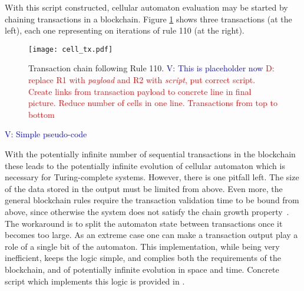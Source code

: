 \documentclass[runningheads]{llncs}
\newcommand{\dnote}[1]{\textcolor{red}{D: {#1}}}
\newcommand{\vk}[1]{\textcolor{blue}{V: {#1}}}
\newcommand{\payload}{\textit{payload}}
\newcommand{\script}{\textit{script}}
\begin{document}

    With this script constructed, cellular automaton evaluation may be started by
    chaining transactions in a blockchain. Figure \ref{fig:txs} shows three
    transactions (at the left), each one representing on iterations of rule 110
    (at the right).

    \begin{figure}[h]
        \label{fig:txs}
        \centering
        \texttt{[image: cell\_tx.pdf]}
        \caption{Transaction chain following Rule 110.
        \vk{This is placeholder now}
        \dnote{replace R1 with \payload{} and R2 with \script{}, put correct script.
        Create links from transaction payload to concrete line in final picture.
        Reduce number of cells in one line. Transactions from top to bottom}
        \label{fig:txs} }
    \end{figure}

    \vk{Simple pseudo-code}

    With the potentially infinite number of sequential transactions in the
    blockchain these leads to the potentially infinite evolution of cellular
    automaton which is necessary for Turing-complete systems.
    However, there is one pitfall left.
    The size of the data stored in the output must be limited from above.
    Even more, the general blockchain rules require the transaction validation
    time to be bound from above, since otherwise the system does not satisfy the
    chain growth property~\cite{garay2015bitcoin}. The workaround is to split
    the automaton state between transactions once it becomes too large. As an
    extreme case one can make a transaction output play a role of a single bit
    of the automaton. This implementation, while being very inefficient, keeps
    the logic simple, and complies both the requirements of the blockchain, and
    of potentially infinite evolution in space and time. Concrete script which
    implements this logic is provided in .
\end{document}
